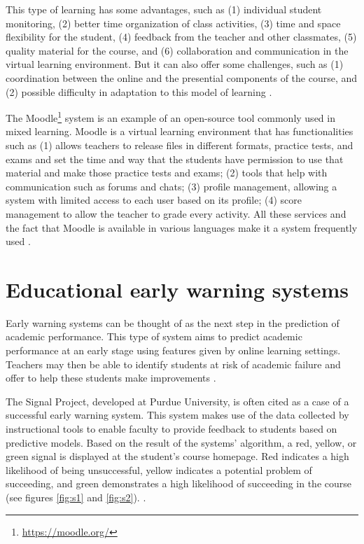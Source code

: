 This type of learning has some advantages, such as (1) individual student monitoring, (2) better time organization of class activities, (3) time and space flexibility for the student, (4) feedback from the teacher and other classmates, (5) quality material for the course, and (6) collaboration and communication in the virtual learning environment. But it can also offer some challenges, such as (1) coordination between the online and the presential components of the course, and (2) possible difficulty in adaptation to this model of learning \cite{nunes2016learning}.

The Moodle\footnote[1]{\hspace{1mm}\url{https://moodle.org/}} system is an example of an open-source tool commonly used in mixed learning. Moodle is a virtual learning environment that has functionalities such as (1) allows teachers to release files in different formats, practice tests, and exams and set the time and way that the students have permission to use that material and make those practice tests and exams; (2) tools that help with communication such as forums and chats; (3) profile management, allowing a system with limited access to each user based on its profile; (4) score management to allow the teacher to grade every activity. All these services and the fact that Moodle is available in various languages make it a system frequently used \cite{lopes2007ambientes}.

\section{Educational early warning systems}

Early warning systems can be thought of as the next step in the prediction of academic performance. This type of system aims to predict academic performance at an early stage using features given by online learning settings. Teachers may then be able to identify students at risk of academic failure and offer to help these students make improvements \cite{akccapinar2019using}.

The Signal Project, developed at Purdue University, is often cited as a case of a successful early warning system. This system makes use of the data collected by instructional tools to enable faculty to provide feedback to students based on predictive models. Based on the result of the systems' algorithm, a red, yellow, or green signal is displayed at the student’s course homepage. Red indicates a high likelihood of being unsuccessful, yellow indicates a potential problem of succeeding, and green demonstrates a high likelihood of succeeding in the course (see figures \ref{fig:s1} and \ref{fig:s2}). \cite{arnold2012course}.

